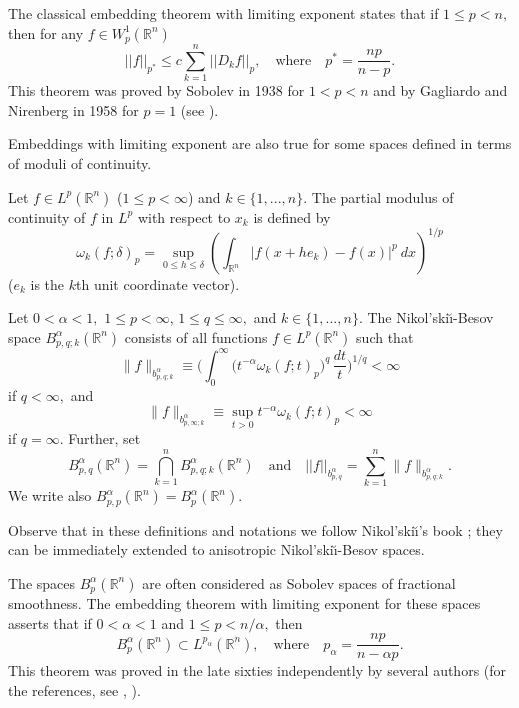 \documentclass[12pt,twoside,reqno]{amsart}
\numberwithin{equation}{section}
\theoremstyle{definition}
\numberwithin{equation}{section}
\begin{document}
The classical embedding theorem with limiting exponent states that
if $1\le p< n,$ then for any $f\in W_p^1({\mathbb{R}}^n)$
\begin{equation}\label{sobolev}
||f||_{p^*}\le c \sum_{k=1}^n||D_k f||_p, \quad\mbox{where}\quad p^*=\frac{np}{n-p}.
\end{equation}
This theorem was proved by Sobolev in 1938 for $1<p<n$ and by
Gagliardo and Nirenberg in 1958 for $p=1$ (see \cite[Chapter
5]{St}).

Embeddings with limiting exponent are also true for some spaces
 defined in terms of moduli of continuity.

Let $f\in L^p({\mathbb R}^n)$ ($1\le p<\infty$) and
$k\in\{1,...,n\}.$ The partial modulus of continuity of $f$ in $L^p$
with respect to $x_k$ is defined by
$$
{\omega}_k(f;\delta)_p =\sup_{0\le h\le {\delta}}\left(\int_{\mathbb R^n}
|f(x+he_k)-f(x)|^p~dx\right)^{1/p}
$$
($e_k$ is the $k$th unit coordinate vector).

Let $0<{\alpha}<1,$  $1\le p<\infty$, $1\le q\le\infty,$ and $k\in\{1,...,n\}.$
 The Nikol'ski\u\i-Besov space
$B^{\alpha}_{p,q;k}({\mathbb R}^n)$ consists of all functions $f\in
L^p({\mathbb R}^n)$ such that
$$
\|f\|_{b^{\alpha}_{p,q;k}}\equiv
\Big(\int_0^{\infty}\big(t^{-{\alpha}}{\omega}_k(f;t)_p\big)^q\,
\frac{dt}{t}\Big)^{1/q}<\infty
$$
if $q<\infty,$ and
$$
\|f\|_{b^{\alpha}_{p,\infty;k}}\equiv \sup_{t>0}t^{-{\alpha}}{\omega}_k(f;t)_p<\infty
$$
 if $q=\infty.$ Further, set
 $$
 B_{p,q}^{\alpha}({\mathbb{R}}^n)= \bigcap_{k=1}^n B^{\alpha}_{p,q;k}({\mathbb R}^n) \quad  \mbox{and}\quad ||f||_{b^{\alpha}_{p,q}}=\sum_{k=1}^n \|f\|_{b^{\alpha}_{p,q;k}}.
 $$
We write also $B_{p,p}^{\alpha}({\mathbb{R}}^n)= B_{p}^{\alpha}({\mathbb{R}}^n).$

Observe that in these definitions and notations we follow
Nikol'ski\u\i's book \cite{Nik}; they can be immediately extended to anisotropic Nikol'ski\u\i-Besov spaces.

The spaces $B^{\alpha}_{p}({\mathbb R}^n)$ are often considered as
  Sobolev spaces of fractional smoothness.
The embedding theorem with limiting exponent for these spaces
asserts that if $0<{\alpha}<1$ and $1\le p<n/{\alpha},$ then
\begin{equation}\label{besov10}
B_p^{\alpha}({\mathbb{R}}^n)\subset L^{p_{\alpha}}({\mathbb{R}}^n), \quad\mbox{where}\quad p_{\alpha}=\frac{np}{n-{\alpha} p}.
\end{equation}
This theorem was proved in the late sixties independently by several
authors (for the references, see \cite[\S \, 18]{BIN}, \cite[Section
10]{K1998}).
\end{document}
